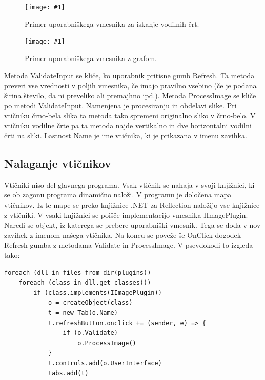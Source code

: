 \documentclass[oneside, a4paper, 12pt]{book}
\newcommand{\slika}[3]{
	\begin{figure}
	\begin{center}
	\texttt{[image: \#1]}
	\end{center}
	\vspace{-20pt}
	\caption{#2}
	\label{#3}
	\end{figure}
}
\begin{document}
\slika{slike/vmesnik-slika-konfiguracija.jpg}{Primer uporabniškega 
vmesnika za iskanje vodilnih črt.}{pic:vmesnik2}

\slika{slike/vmesnik-samo-graf.jpg}{Primer uporabniškega vmesnika z 
grafom.}{pic:vmesnik3}

Metoda ValidateInput se kliče, ko uporabnik pritisne gumb Refresh. 
Ta metoda preveri vse vrednosti v poljih vmesnika, če imajo pravilno 
vsebino (če je podana širina število, da ni preveliko ali premajhno ipd.).
Metoda ProcessImage se kliče po metodi ValidateInput. Namenjena je 
procesiranju in obdelavi slike. Pri vtičniku črno-bela slika ta metoda 
tako spremeni originalno sliko v črno-belo. V vtičniku vodilne črte pa 
ta metoda najde vertikalno in dve horizontalni vodilni črti na sliki. 
Lastnost Name je ime vtičnika, ki je prikazana v imenu zavihka.

\subsection{Nalaganje vtičnikov}
Vtičniki niso del glavnega programa. Vsak vtičnik se nahaja v svoji 
knjižnici, ki se ob zagonu programa dinamično naloži. V programu je 
določena mapa vtičnikov. Iz te mape se preko knjižnice .NET za Reflection 
\cite{oreilly-cs} naložijo vse knjižnice z vtičniki. V vsaki knjižnici 
se poišče implementacijo vmesnika IImagePlugin. Naredi se objekt, iz 
katerega se prebere uporabniški vmesnik. Tega se doda v nov zavihek z 
imenom našega vtičnika. Na koncu se poveže še OnClick dogodek Refresh 
gumba z metodama Validate in ProcessImage. V psevdokodi to izgleda tako:
\begin{samepage}
\begin{verbatim}
foreach (dll in files_from_dir(plugins))
    foreach (class in dll.get_classes())
        if (class.implements(IImagePlugin))
            o = createObject(class)
            t = new Tab(o.Name)
            t.refreshButton.onclick += (sender, e) => {
                if (o.Validate)
                    o.ProcessImage()
            }
            t.controls.add(o.UserInterface)
            tabs.add(t)
\end{verbatim}
\end{samepage}
\end{document}
